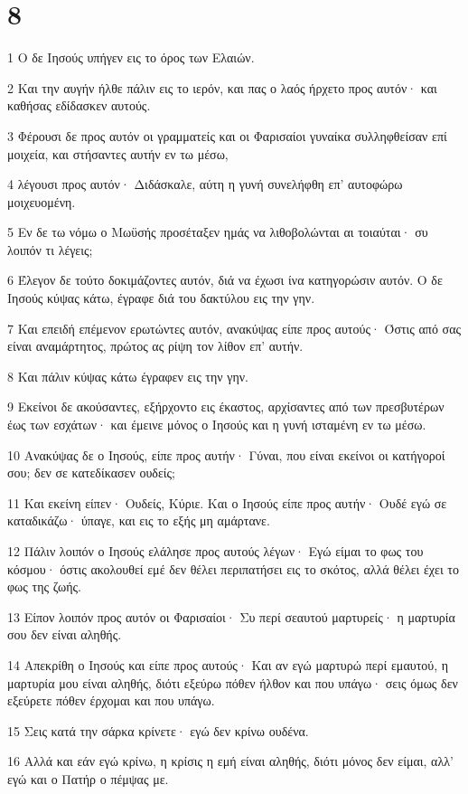 \chapter{8}

\par 1 Ο δε Ιησούς υπήγεν εις το όρος των Ελαιών.
\par 2 Και την αυγήν ήλθε πάλιν εις το ιερόν, και πας ο λαός ήρχετο προς αυτόν· και καθήσας εδίδασκεν αυτούς.
\par 3 Φέρουσι δε προς αυτόν οι γραμματείς και οι Φαρισαίοι γυναίκα συλληφθείσαν επί μοιχεία, και στήσαντες αυτήν εν τω μέσω,
\par 4 λέγουσι προς αυτόν· Διδάσκαλε, αύτη η γυνή συνελήφθη επ' αυτοφώρω μοιχευομένη.
\par 5 Εν δε τω νόμω ο Μωϋσής προσέταξεν ημάς να λιθοβολώνται αι τοιαύται· συ λοιπόν τι λέγεις;
\par 6 Έλεγον δε τούτο δοκιμάζοντες αυτόν, διά να έχωσι ίνα κατηγορώσιν αυτόν. Ο δε Ιησούς κύψας κάτω, έγραφε διά του δακτύλου εις την γην.
\par 7 Και επειδή επέμενον ερωτώντες αυτόν, ανακύψας είπε προς αυτούς· Όστις από σας είναι αναμάρτητος, πρώτος ας ρίψη τον λίθον επ' αυτήν.
\par 8 Και πάλιν κύψας κάτω έγραφεν εις την γην.
\par 9 Εκείνοι δε ακούσαντες, εξήρχοντο εις έκαστος, αρχίσαντες από των πρεσβυτέρων έως των εσχάτων· και έμεινε μόνος ο Ιησούς και η γυνή ισταμένη εν τω μέσω.
\par 10 Ανακύψας δε ο Ιησούς, είπε προς αυτήν· Γύναι, που είναι εκείνοι οι κατήγοροί σου; δεν σε κατεδίκασεν ουδείς;
\par 11 Και εκείνη είπεν· Ουδείς, Κύριε. Και ο Ιησούς είπε προς αυτήν· Ουδέ εγώ σε καταδικάζω· ύπαγε, και εις το εξής μη αμάρτανε.
\par 12 Πάλιν λοιπόν ο Ιησούς ελάλησε προς αυτούς λέγων· Εγώ είμαι το φως του κόσμου· όστις ακολουθεί εμέ δεν θέλει περιπατήσει εις το σκότος, αλλά θέλει έχει το φως της ζωής.
\par 13 Είπον λοιπόν προς αυτόν οι Φαρισαίοι· Συ περί σεαυτού μαρτυρείς· η μαρτυρία σου δεν είναι αληθής.
\par 14 Απεκρίθη ο Ιησούς και είπε προς αυτούς· Και αν εγώ μαρτυρώ περί εμαυτού, η μαρτυρία μου είναι αληθής, διότι εξεύρω πόθεν ήλθον και που υπάγω· σεις όμως δεν εξεύρετε πόθεν έρχομαι και που υπάγω.
\par 15 Σεις κατά την σάρκα κρίνετε· εγώ δεν κρίνω ουδένα.
\par 16 Αλλά και εάν εγώ κρίνω, η κρίσις η εμή είναι αληθής, διότι μόνος δεν είμαι, αλλ' εγώ και ο Πατήρ ο πέμψας με.
